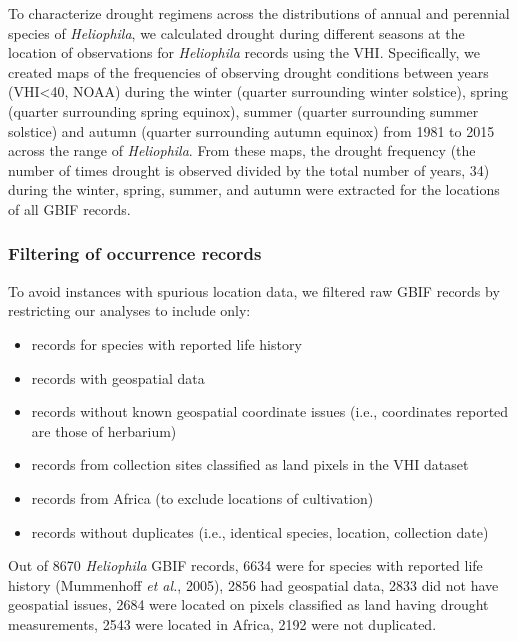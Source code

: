 \documentclass[man,floatsintext]{apa6}
\providecommand{\tightlist}{%
  \setlength{\itemsep}{0pt}\setlength{\parskip}{0pt}}
\theoremstyle{definition}
\theoremstyle{definition}
\theoremstyle{definition}
\theoremstyle{remark}
\begin{document}
To characterize drought regimens across the distributions of annual and
perennial species of \emph{Heliophila}, we calculated drought during
different seasons at the location of observations for \emph{Heliophila}
records using the VHI. Specifically, we created maps of the frequencies
of observing drought conditions between years (VHI\textless{}40, NOAA)
during the winter (quarter surrounding winter solstice), spring (quarter
surrounding spring equinox), summer (quarter surrounding summer
solstice) and autumn (quarter surrounding autumn equinox) from 1981 to
2015 across the range of \emph{Heliophila}. From these maps, the drought
frequency (the number of times drought is observed divided by the total
number of years, 34) during the winter, spring, summer, and autumn were
extracted for the locations of all GBIF records.

\hypertarget{filtering-of-occurrence-records}{%
\subsubsection{Filtering of occurrence
records}\label{filtering-of-occurrence-records}}

To avoid instances with spurious location data, we filtered raw GBIF
records by restricting our analyses to include only:

\begin{itemize}
\tightlist
\item
  records for species with reported life history\\
\item
  records with geospatial data\\
\item
  records without known geospatial coordinate issues (i.e., coordinates
  reported are those of herbarium)\\
\item
  records from collection sites classified as land pixels in the VHI
  dataset\\
\item
  records from Africa (to exclude locations of cultivation)
\item
  records without duplicates (i.e., identical species, location,
  collection date)
\end{itemize}

Out of 8670 \emph{Heliophila} GBIF records, 6634 were for species with
reported life history (Mummenhoff \emph{et al.}, 2005), 2856 had
geospatial data, 2833 did not have geospatial issues, 2684 were located
on pixels classified as land having drought measurements, 2543 were
located in Africa, 2192 were not duplicated.
\end{document}
